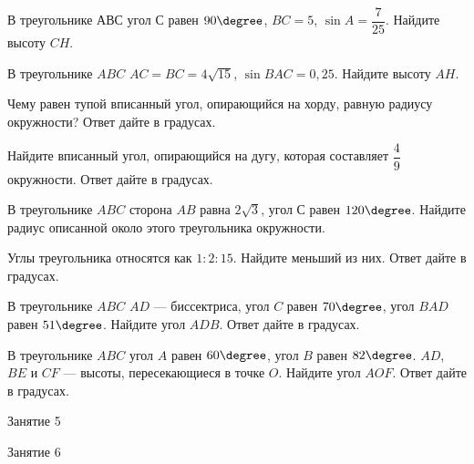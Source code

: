 \begin{homework}[number=2]
	\begin{listofex}
		\item В треугольнике \( АВС \) угол \( С \) равен \( 90\degree \), \( BC = 5 \),  \( \sin A = \dfrac{7}{25} \).  Найдите высоту \( CH \).
		\item В треугольнике \( ABC \) \( AC = BC = 4\sqrt{15 }\),  \( \sin BAC = 0,25 \). Найдите высоту \( AH \).
		\item Чему равен тупой вписанный угол, опирающийся на хорду, равную радиусу окружности? Ответ дайте в градусах.
		\item Найдите вписанный угол, опирающийся на дугу, которая составляет \( \dfrac{4}{9} \) окружности. Ответ дайте в градусах.
		\item В треугольнике \( ABC \) сторона \( AB \) равна \( 2 \sqrt{3} \), угол \( С \) равен \( 120\degree \). Найдите радиус описанной около этого треугольника окружности.
		\item Углы треугольника относятся как \( 1:2:15 \). Найдите меньший из них. Ответ дайте в градусах.
		\item В треугольнике \( ABC \) \( AD \) --- биссектриса, угол \( C \) равен \( 70\degree \), угол \( BAD \) равен \( 51\degree \). Найдите угол \( ADB \). Ответ дайте в градусах.
		\item В треугольнике \( ABC \) угол \( A \) равен \( 60\degree \), угол \( B \) равен \( 82\degree \). \( AD \), \( BE \) и \( CF \) --- высоты, пересекающиеся в точке \( O \). Найдите угол \( AOF \). Ответ дайте в градусах.
	\end{listofex}
\end{homework}

\begin{class}[number=5]
	\begin{listofex}
		\item Занятие 5
	\end{listofex}
\end{class}

\begin{class}[number=6]
	\begin{listofex}
		\item Занятие 6
	\end{listofex}
\end{class}

